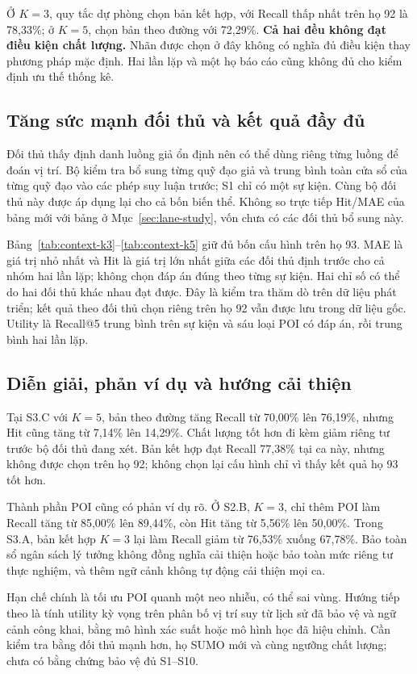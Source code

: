 Ở $K=3$, quy tắc dự phòng chọn bản kết hợp, với Recall thấp nhất trên họ 92 là 78,33\%; ở $K=5$, chọn bản theo đường với 72,29\%. \textbf{Cả hai đều không đạt điều kiện chất lượng.} Nhãn được chọn ở đây không có nghĩa đủ điều kiện thay phương pháp mặc định. Hai lần lặp và một họ báo cáo cũng không đủ cho kiểm định ưu thế thống kê.

\subsection{Tăng sức mạnh đối thủ và kết quả đầy đủ}

Đối thủ thấy định danh luồng giả ổn định nên có thể dùng riêng từng luồng để đoán vị trí. Bộ kiểm tra bổ sung từng quỹ đạo giả và trung bình toàn cửa sổ của từng quỹ đạo vào các phép suy luận trước; S1 chỉ có một sự kiện. Cùng bộ đối thủ này được áp dụng lại cho cả bốn biến thể. Không so trực tiếp Hit/MAE của bảng mới với bảng ở Mục~\ref{sec:lane-study}, vốn chưa có các đối thủ bổ sung này.

Bảng~\ref{tab:context-k3}--\ref{tab:context-k5} giữ đủ bốn cấu hình trên họ 93. MAE là giá trị nhỏ nhất và Hit là giá trị lớn nhất giữa các đối thủ định trước cho cả nhóm hai lần lặp; không chọn đáp án đúng theo từng sự kiện. Hai chỉ số có thể do hai đối thủ khác nhau đạt được. Đây là kiểm tra thăm dò trên dữ liệu phát triển; kết quả theo đối thủ chọn riêng trên họ 92 vẫn được lưu trong dữ liệu gốc. Utility là Recall@5 trung bình trên sự kiện và sáu loại POI có đáp án, rồi trung bình hai lần lặp.



\subsection{Diễn giải, phản ví dụ và hướng cải thiện}

Tại S3.C với $K=5$, bản theo đường tăng Recall từ 70,00\% lên 76,19\%, nhưng Hit cũng tăng từ 7,14\% lên 14,29\%. Chất lượng tốt hơn đi kèm giảm riêng tư trước bộ đối thủ đang xét. Bản kết hợp đạt Recall 77,38\% tại ca này, nhưng không được chọn trên họ 92; không chọn lại cấu hình chỉ vì thấy kết quả họ 93 tốt hơn.

Thành phần POI cũng có phản ví dụ rõ. Ở S2.B, $K=3$, chỉ thêm POI làm Recall tăng từ 85,00\% lên 89,44\%, còn Hit tăng từ 5,56\% lên 50,00\%. Trong S3.A, bản kết hợp $K=3$ lại làm Recall giảm từ 76,53\% xuống 67,78\%. Bảo toàn sổ ngân sách lý tưởng không đồng nghĩa cải thiện hoặc bảo toàn mức riêng tư thực nghiệm, và thêm ngữ cảnh không tự động cải thiện mọi ca.

Hạn chế chính là tối ưu POI quanh một neo nhiễu, có thể sai vùng. Hướng tiếp theo là tính utility kỳ vọng trên phân bố vị trí suy từ lịch sử đã bảo vệ và ngữ cảnh công khai, bằng mô hình xác suất hoặc mô hình học đã hiệu chỉnh. Cần kiểm tra bằng đối thủ mạnh hơn, họ SUMO mới và cùng ngưỡng chất lượng; chưa có bằng chứng bảo vệ đủ S1--S10.
